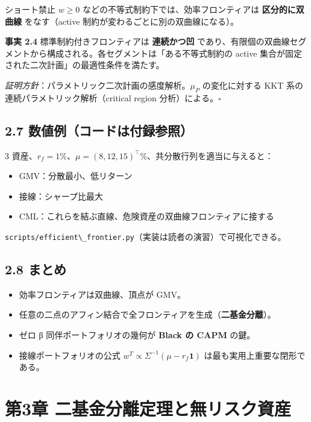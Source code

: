 \documentclass[11pt,a4paper]{report}
\begin{document}
ショート禁止 $w \ge 0$ などの不等式制約下では、効率フロンティアは \textbf{区分的に双曲線} をなす（active 制約が変わるごとに別の双曲線になる）。

\textbf{事実 2.4} 標準制約付きフロンティアは \textbf{連続かつ凹} であり、有限個の双曲線セグメントから構成される。各セグメントは「ある不等式制約の active 集合が固定された二次計画」の最適性条件を満たす。

\emph{証明方針}：パラメトリック二次計画の感度解析。$\mu_P$ の変化に対する KKT 系の連続パラメトリック解析（critical region 分析）による。$\square$

\section{2.7 数値例（コードは付録参照）}

3 資産、$r_f = 1\%$、$\mu = (8, 12, 15)^\top$\%、共分散行列を適当に与えると：
\begin{itemize}
\item GMV：分散最小、低リターン
\item 接線：シャープ比最大
\item CML：これらを結ぶ直線、危険資産の双曲線フロンティアに接する
\end{itemize}

\texttt{scripts/efficient\textbackslash{}\_frontier.py}（実装は読者の演習）で可視化できる。

\section{2.8 まとめ}

\begin{itemize}
\item 効率フロンティアは双曲線、頂点が GMV。
\item 任意の二点のアフィン結合で全フロンティアを生成（\textbf{二基金分離}）。
\item ゼロ β 同伴ポートフォリオの幾何が \textbf{Black の CAPM} の鍵。
\item 接線ポートフォリオの公式 $w^T \propto \Sigma^{-1}(\mu - r_f\mathbf{1})$ は最も実用上重要な閉形である。
\end{itemize}

\noindent\hrulefill

\chapter{第3章 二基金分離定理と無リスク資産}
\end{document}
